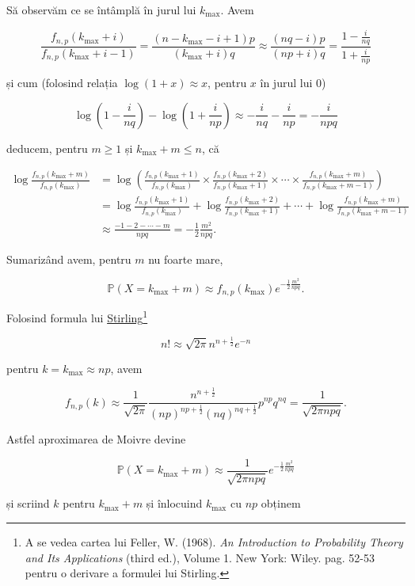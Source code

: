 \documentclass[]{article}
\let\rmarkdownfootnote\footnote%
\def\footnote{\protect\rmarkdownfootnote}
\begin{document}
Să observăm ce se întâmplă în jurul lui \(k_{\max}\). Avem

\[
\frac{f_{n,p}(k_{\max}+i)}{f_{n,p}(k_{\max}+i-1)} = \frac{(n-k_{\max}-i+1)p}{(k_{\max}+i)q}\approx \frac{(nq-i)p}{(np+i)q} = \frac{1-\frac{i}{nq}}{1+\frac{i}{np}}
\]

și cum (folosind relația \(\log(1+x)\approx x\), pentru \(x\) în jurul
lui \(0\))

\[
\log\left(1-\frac{i}{nq}\right) - \log\left(1+\frac{i}{np}\right) \approx -\frac{i}{nq}-\frac{i}{np} = -\frac{i}{npq}
\]

deducem, pentru \(m\geq 1\) și \(k_{\max}+m\leq n\), că

\begin{align*}
  \log\frac{f_{n,p}(k_{\max}+m)}{f_{n,p}(k_{\max})} &= \log\left(\frac{f_{n,p}(k_{\max}+1)}{f_{n,p}(k_{\max})}\times \frac{f_{n,p}(k_{\max}+2)}{f_{n,p}(k_{\max}+1)}\times\cdots\times\frac{f_{n,p}(k_{\max}+m)}{f_{n,p}(k_{\max}+m-1)}\right)\\
  &= \log\frac{f_{n,p}(k_{\max}+1)}{f_{n,p}(k_{\max})}+ \log\frac{f_{n,p}(k_{\max}+2)}{f_{n,p}(k_{\max}+1)}+\cdots+\log\frac{f_{n,p}(k_{\max}+m)}{f_{n,p}(k_{\max}+m-1)}\\
  &\approx \frac{-1-2-\cdots-m}{npq} = -\frac{1}{2}\frac{m^2}{npq}.
\end{align*}

Sumarizând avem, pentru \(m\) nu foarte mare,

\[
  \mathbb{P}(X=k_{\max}+m)\approx f_{n,p}(k_{\max})e^{-\frac{1}{2}\frac{m^2}{npq}}.
\]

Folosind formula lui
\href{https://en.wikipedia.org/wiki/Stirling\%27s_approximation}{Stirling}\footnote{A
  se vedea cartea lui Feller, W. (1968). \emph{An Introduction to
  Probability Theory and Its Applications} (third ed.), Volume 1. New
  York: Wiley. pag. 52-53 pentru o derivare a formulei lui Stirling.}

\[
  n!\approx \sqrt{2\pi}n^{n+\frac{1}{2}}e^{-n}
\]

pentru \(k = k_{\max}\approx np\), avem

\[
f_{n,p}(k)\approx \frac{1}{\sqrt{2\pi}}\frac{n^{n+\frac{1}{2}}}{(np)^{np+\frac{1}{2}}(nq)^{nq+\frac{1}{2}}}p^{np}q^{nq}= \frac{1}{\sqrt{2\pi npq}}.
\]

Astfel aproximarea de Moivre devine

\[
  \mathbb{P}(X=k_{\max}+m)\approx \frac{1}{\sqrt{2\pi npq}}e^{-\frac{1}{2}\frac{m^2}{npq}}
\]

și scriind \(k\) pentru \(k_{\max}+m\) și înlocuind \(k_{\max}\) cu
\(np\) obținem
\end{document}
